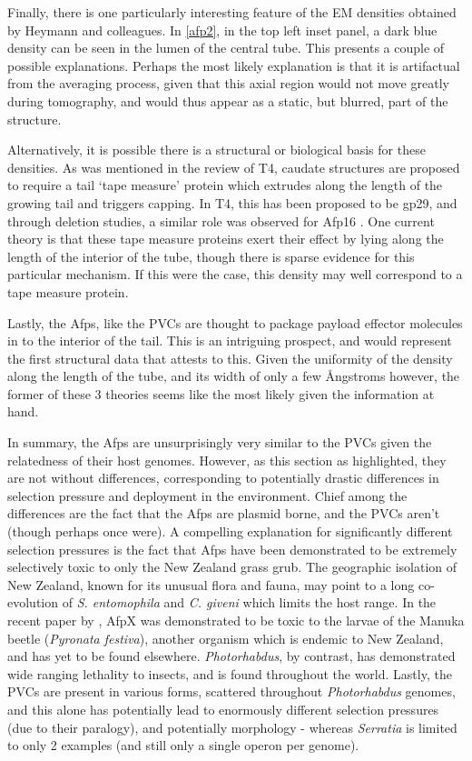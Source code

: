 Finally, there is one particularly interesting feature of the EM densities obtained by Heymann and colleagues. In \vref{afp2}, in the top left inset panel, a dark blue density can be seen in the lumen of the central tube. This presents a couple of possible explanations. Perhaps the most likely explanation is that it is artifactual from the averaging process, given that this axial region would not move greatly during tomography, and would thus appear as a static, but blurred, part of the structure.

Alternatively, it is possible there is a structural or biological basis for these densities. As was mentioned in the review of T4, caudate structures are proposed to require a tail `tape measure' protein which extrudes along the length of the growing tail and triggers capping. In T4, this has been proposed to be gp29, and through deletion studies, a similar role was observed for Afp16 \citep{Rybakova2013, Abuladze1994, Katsura1987}. One current theory is that these tape measure proteins exert their effect by lying along the length of the interior of the tube, though there is sparse evidence for this particular mechanism. If this were the case, this density may well correspond to a tape measure protein.

Lastly, the Afps, like the PVCs are thought to package payload effector molecules in to the interior of the tail. This is an intriguing prospect, and would represent the first structural data that attests to this. Given the uniformity of the density along the length of the tube, and its width of only a few \AA{}ngstroms however, the former of these 3 theories seems like the most likely given the information at hand.

In summary, the Afps are unsurprisingly very similar to the PVCs given the relatedness of their host genomes. However, as this section as highlighted, they are not without differences, corresponding to potentially drastic differences in selection pressure and deployment in the environment. Chief among the differences are the fact that the Afps are plasmid borne, and the PVCs aren't (though perhaps once were). A compelling explanation for significantly different selection pressures is the fact that Afps have been demonstrated to be extremely selectively toxic to only the New Zealand grass grub. The geographic isolation of New Zealand, known for its unusual flora and fauna, may point to a long co-evolution of \emph{S. entomophila} and \emph{C. giveni} which limits the host range. In the recent paper by \cite{Hurst2008}, AfpX was demonstrated to be toxic to the larvae of the Manuka beetle (\emph{Pyronata festiva}), another organism which is endemic to New Zealand, and has yet to be found elsewhere. \emph{Photorhabdus}, by contrast, has demonstrated wide ranging lethality to insects, and is found throughout the world. Lastly, the PVCs are present in various forms, scattered throughout \emph{Photorhabdus} genomes, and this alone has potentially lead to enormously different selection pressures (due to their paralogy), and potentially morphology - whereas \emph{Serratia} is limited to only 2 examples (and still only a single operon per genome).


